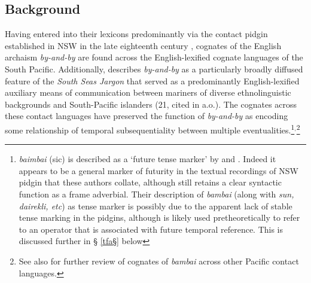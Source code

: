 \documentclass[11pt]{article}
\begin{document}
\subsection{Background}

Having entered into their lexicons predominantly via the contact pidgin established in NSW in the late eighteenth century \citep{Troy1994}, cognates of the English archaism \textit{by-and-by} are found across the English-lexified cognate languages of the South Pacific. Additionally, \citet{Clark1979} describes \textit{by-and-by} as a particularly broadly diffused feature of the \textit{South Seas Jargon} that served as a predominantly English-lexified auxiliary means of communication between mariners of diverse ethnolinguistic backgrounds and South-Pacific islanders (21, cited in \citealt[262\textit{ff}]{Harris1986a} a.o.). The cognates across these contact languages have preserved the function of \textit{by-and-by} as encoding some relationship of temporal subsequentiality between multiple eventualities.\footnote{\textit{baimbai} (sic) is described as a `future tense marker' by \citet[112,418,711]{Troy1994} and \citep[268]{Harris1986a}. Indeed it appears to be a general marker of futurity in the textual recordings of NSW pidgin that these authors collate, although still retains a clear syntactic function as a frame adverbial. Their description of \textit{bambai} (along with \textit{sun, dairekli, etc}) as tense marker is possibly due to the apparent lack of stable tense marking in the pidgins, although is likely used pretheoretically to refer to an operator that is associated with future temporal reference. This is discussed further in § \ref{tfa§} below}$^,$\footnote{See also \citealt{Angelo2016} for further review of cognates of \textit{bambai} across other Pacific contact languages.}
\end{document}
